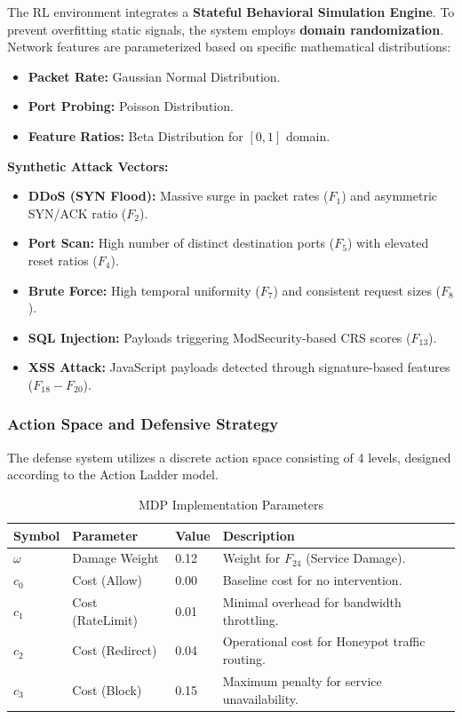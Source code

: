\documentclass[12pt,a4paper]{report}
\begin{document}
The RL environment integrates a \textbf{Stateful Behavioral Simulation Engine}. To prevent overfitting static signals, the system employs \textbf{domain randomization}. Network features are parameterized based on specific mathematical distributions:
\begin{itemize}
    \item \textbf{Packet Rate:} Gaussian Normal Distribution.
    \item \textbf{Port Probing:} Poisson Distribution.
    \item \textbf{Feature Ratios:} Beta Distribution for $[0, 1]$ domain.
\end{itemize}

\textbf{Synthetic Attack Vectors:}
\begin{itemize}
    \item \textbf{DDoS (SYN Flood):} Massive surge in packet rates ($F_1$) and asymmetric SYN/ACK ratio ($F_2$).
    \item \textbf{Port Scan:} High number of distinct destination ports ($F_5$) with elevated reset ratios ($F_4$).
    \item \textbf{Brute Force:} High temporal uniformity ($F_7$) and consistent request sizes ($F_8$).
    \item \textbf{SQL Injection:} Payloads triggering ModSecurity-based CRS scores ($F_{13}$).
    \item \textbf{XSS Attack:} JavaScript payloads detected through signature-based features ($F_{18}-F_{20}$).
\end{itemize}

\subsubsection{Action Space and Defensive Strategy}

The defense system utilizes a discrete action space consisting of 4 levels, designed according to the Action Ladder model.

\begin{table}[htbp]
\centering
\caption{MDP Implementation Parameters}
\label{tab:mdp_params}
\begin{tabular}{C{1.5cm} L{3.5cm} C{2cm} L{6.5cm}}
\toprule
\textbf{Symbol} & \textbf{Parameter} & \textbf{Value} & \textbf{Description} \\
\midrule
$\omega$ & Damage Weight & 0.12 & Weight for $F_{24}$ (Service Damage). \\
$c_0$ & Cost (Allow) & 0.00 & Baseline cost for no intervention. \\
$c_1$ & Cost (RateLimit) & 0.01 & Minimal overhead for bandwidth throttling. \\
$c_2$ & Cost (Redirect) & 0.04 & Operational cost for Honeypot traffic routing. \\
$c_3$ & Cost (Block) & 0.15 & Maximum penalty for service unavailability. \\
\bottomrule
\end{tabular}
\end{table}
\end{document}
